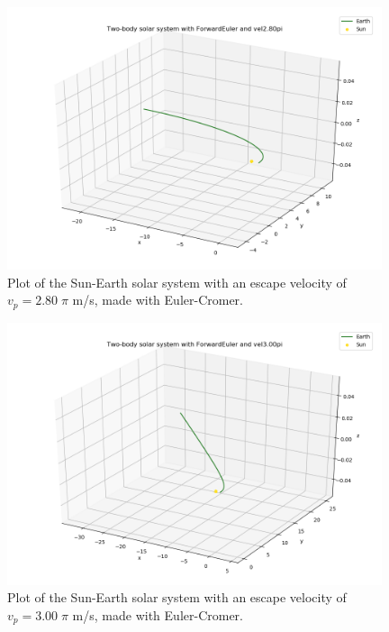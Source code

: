 \documentclass{article}
\begin{document}
    \begin{figure}[H]
        \centering
        \includegraphics[width = 11cm]{img/plot3D_S_E_F_vel280pi.png}
        \caption{Plot of the Sun-Earth solar system with an escape velocity of $v_p = 2.80 \; \pi$ m/s, made with Euler-Cromer. }
        \label{fig:plot3D_S_E_F_vel280pi}
    \end{figure}

    \begin{figure}[H]
        \centering
        \includegraphics[width = 11cm]{img/plot3D_S_E_F_vel300pi.png}
        \caption{Plot of the Sun-Earth solar system with an escape velocity of $v_p = 3.00 \; \pi$ m/s, made with Euler-Cromer. }
        \label{fig:plot3D_S_E_F_vel300pi}
    \end{figure}
\end{document}
